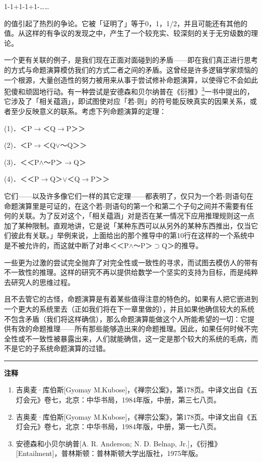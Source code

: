 \documentclass[
  12pt,
  twoside,
  openright,
  oldfontcommands,
]{memoir}
\begin{document}
1-1+1-1+1-\ldots\ldots{}

的值引起了热烈的争论。它被「证明了」等于0，1，1/2，并且可能还有其他的值。从这样的有争议的发现之中，产生了一个较充实、较深刻的关于无穷级数的理论。

一个更有关联的例子，是我们现在正面对面碰到的矛盾------即在我们真正进行思考的方式与命题演算模仿我们的方式二者之间的矛盾。这曾经是许多逻辑学家烦恼的一个根源，大量创造性的努力被用来从事于尝试修补命题演算，以使得它不会如此犯傻和顽固地行动。有一种尝试是安德森和贝尔纳普在《衍推》\hyperref[fn:Chapter07-3]{\textsuperscript{3}}一书中提出的，它涉及了「相关蕴涵」，即试图使对应「若-则」的符号能反映真实的因果关系，或者至少反映意义的联系。考虑下列命题演算的定理：

(1)．＜P$\rightarrow$＜Q$\rightarrow$P＞＞

(2)．＜P$\rightarrow$＜Q$\vee$～Q＞＞

(3)．＜＜P$\wedge$～P＞$\rightarrow$Q＞

(4)．＜＜P$\rightarrow$Q＞$\vee$＜Q$\rightarrow$P＞＞

它们------以及许多像它们一样的其它定理------都表明了，仅只为一个若-则语句在命题演算里是可证的，在这个若-则语句的第一个和第二个子句之间并不需要有任何的关联。为了反对这个，「相关蕴涵」对是否在某一情况下应用推理规则这一点加了某种限制。直观地讲，它是说「某种东西可以从另外的某种东西推出，仅当它们彼此有关联。」举例来说，上面给出的那个推导中的第10行在这样的一个系统中是不被允许的，而这就中断了对串＜＜P$\wedge$～P＞$\supset$Q＞的推导。

一些更为过激的尝试完全抛弃了对完全性或一致性的寻求，而试图去模仿人的带有不一致性的推理。这样的研究不再以提供给数学一个坚实的支持为目标，而是纯粹去研究人的思维过程。

且不去管它的古怪，命题演算是有着某些值得注意的特色的。如果有人把它嵌进到一个更大的系统里去（正如我们将在下一章里做的），并且如果他确信较大的系统不包含矛盾（我们将这样确信），那么命题演算能做这个人所能希望的一切：它提供有效的命题推理------所有那些能够造出来的命题推理。因此，如果任何时候不完全性或不一致性被暴露出来，人们就能确信，这一定是那个较大的系统的毛病，而不是它的子系统命题演算的过错。

{\footnotesize\setlength{\parindent}{0pt}%
\noindent\textcolor{rulegray}{\rule{0.35\linewidth}{0.3pt}}\par\vspace{2pt}
\noindent\textbf{注释}\par\vspace{3pt}
\begin{enumerate}
\label{fn:Chapter07-1}{}
\item 吉奥麦·库伯斯[Gyomay M.Kubose]，《禅宗公案》，第178页。中译文出自《五灯会元》卷七，北京：中华书局，1984年版，中册，第三七八页。
\label{fn:Chapter07-2}{}
\item 吉奥麦·库伯斯[Gyomay M.Kubose]，《禅宗公案》，第178页。中译文出自《五灯会元》卷七，北京：中华书局，1984年版，中册，第一七八页。
\label{fn:Chapter07-3}{}
\item 安德森和小贝尔纳普[A. R. Anderson; N. D. Belnap, Jr.]，《衍推》[Entailment]，普林斯顿：普林斯顿大学出版社，1975年版。
\end{enumerate}
}
\end{document}
